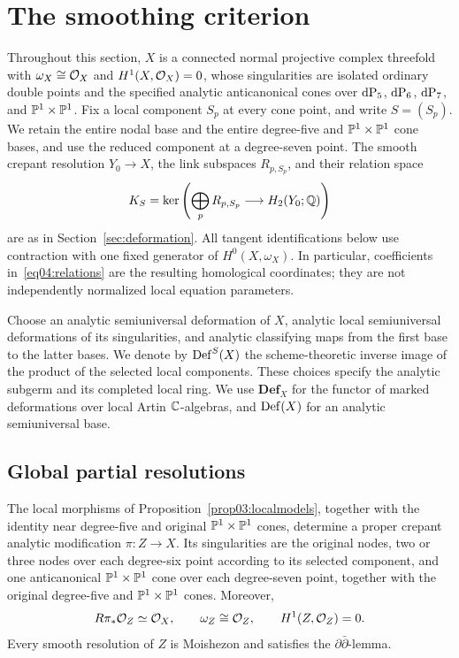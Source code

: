 \section{The smoothing criterion}\label{sec04:smoothing}

Throughout this section, $X$ is a connected normal projective complex
threefold with $\omega_X\cong\mathcal{O}_X$ and $H^1(X,\mathcal{O}_X)=0$, whose
singularities are isolated ordinary double points and the specified analytic
anticanonical cones over $\mathrm{dP}_5$, $\mathrm{dP}_6$, $\mathrm{dP}_7$, and
$\mathbb{P}^1\times\mathbb{P}^1$.  Fix a local component $S_p$
at every cone point, and write $S=(S_p)$.  We retain the entire nodal base
and the entire degree-five and $\mathbb{P}^1\times\mathbb{P}^1$ cone bases, and use the reduced
component at a degree-seven point.  The smooth crepant
resolution $Y_0\to X$, the link subspaces $R_{p,S_p}$, and their relation
space
\begin{equation}\label{eq04:relations}
 K_S=\ker\left(\bigoplus_p R_{p,S_p}
                   \longrightarrow H_2(Y_0;\mathbb{Q})\right)
\end{equation}
are as in Section~\ref{sec:deformation}.  All tangent identifications below
use contraction with one fixed generator of $H^0(X,\omega_X)$.  In
particular, coefficients in~\eqref{eq04:relations} are the resulting
homological coordinates; they are not independently normalized local
equation parameters.

Choose an analytic semiuniversal deformation of $X$, analytic local
semiuniversal deformations of its singularities, and analytic classifying
maps from the first base to the latter bases.  We denote by $\operatorname{Def}^S(X)$
the scheme-theoretic inverse image of the product of the selected local
components.  These choices specify the analytic subgerm and its completed
local ring.  We use $\mathbf{Def}_X$ for the functor of marked deformations
over local Artin $\mathbb{C}$-algebras, and $\operatorname{Def}(X)$ for an analytic
semiuniversal base.

\subsection{Global partial resolutions}

\begin{proposition}\label{prop04:globalmodel}
The local morphisms of Proposition~\ref{prop03:localmodels}, together
with the identity near degree-five and original
$\mathbb{P}^1\times\mathbb{P}^1$ cones, determine a
proper crepant analytic modification $\pi:Z\to X$.  Its singularities are
the original nodes, two or three nodes over each degree-six point according
to its selected component, and one anticanonical
$\mathbb{P}^1\times\mathbb{P}^1$ cone over each degree-seven point, together with
the original degree-five and $\mathbb{P}^1\times\mathbb{P}^1$ cones.  Moreover,
\begin{equation}\label{eq04:cy}
 R\pi_*\mathcal{O}_Z\simeq\mathcal{O}_X,\qquad
 \omega_Z\cong\mathcal{O}_Z,\qquad H^1(Z,\mathcal{O}_Z)=0.
\end{equation}
Every smooth resolution of $Z$ is Moishezon and satisfies the
$\partial\bar\partial$-lemma.
\end{proposition}

